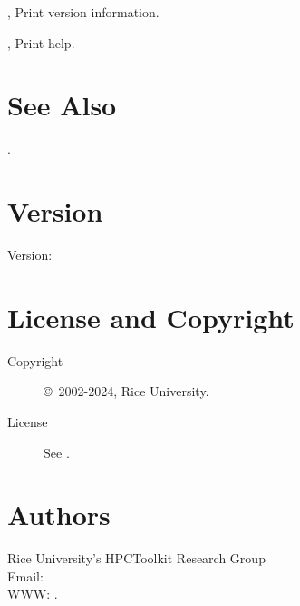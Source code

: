 \documentclass[english]{article}
\begin{document}
\begin{Description}
\item[\Opt{-V}, \Opt{--version}] Print version information.
\item[\Opt{-h}, \Opt{--help}] Print help.
\end{Description}


\section{See Also}

.

\section{Version}

Version: \Version

\section{License and Copyright}

\begin{description}
\item[Copyright] \copyright\ 2002-2024, Rice University.
\item[License] See .
\end{description}

\section{Authors}

\noindent
Rice University's HPCToolkit Research Group \\
Email:  \\
WWW: .

\LatexManEnd
\end{document}
